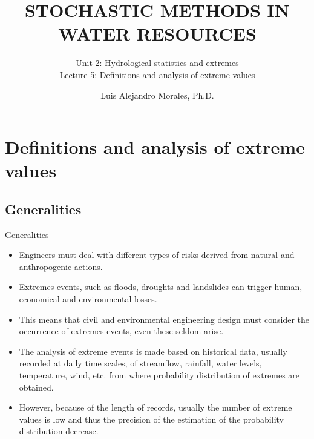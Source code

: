 \documentclass[8pt]{beamer}
\title{STOCHASTIC METHODS IN WATER RESOURCES}
\subtitle{Unit 2: Hydrological statistics and extremes \\ Lecture 5: Definitions and analysis of extreme values}
\author{Luis Alejandro Morales, Ph.D.}
\institute{Universidad Nacional de Colombia \\ Department of Civil and Agriculture Engineering} %
\renewcommand{\emph}[1]{\textcolor{myorange}{#1}}
\begin{document}
\begin{frame}
    \titlepage
\end{frame}

\section{Definitions and analysis of extreme values}
\subsection{Generalities}
\begin{frame}{Generalities}
    \begin{itemize}
        \item Engineers must deal with different types of risks derived from natural and anthropogenic actions. 
        \item Extremes events, such as \emph{floods}, \emph{droughts} and \emph{landslides} can trigger human, economical and environmental losses. 
        \item This means that civil and environmental  engineering design must consider the occurrence of extremes events, even these seldom arise. 
        \item The analysis of extreme events is made based on historical data, usually recorded at daily time scales, of streamflow, rainfall, water levels, temperature, wind, etc. from where probability distribution of extremes are obtained. 
        \item However, because of the length of  records, usually the number of extreme values is low and  thus the precision of the estimation of the probability distribution decrease.    
    \end{itemize}
\end{frame}
\end{document}
